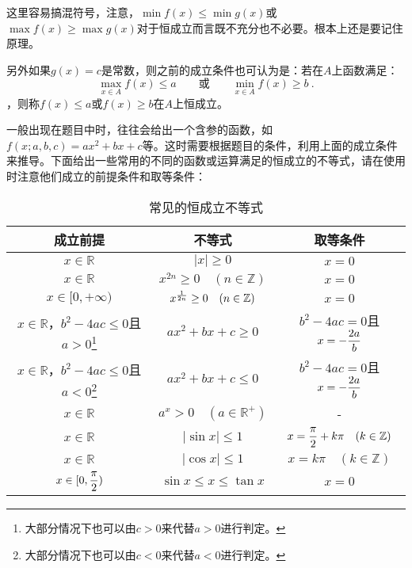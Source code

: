 这里容易搞混符号，注意，$\min f(x)\leq\min g(x)$或$\max f(x)\geq\max g(x)$对于恒成立而言既不充分也不必要。根本上还是要记住原理。

另外如果$g(x)=c$是常数，则之前的成立条件也可认为是：若在$A$上函数满足：
\begin{equation}
\displaystyle\max_{x\in A} f(x)\leq a\qquad\text{或}\qquad\min_{x\in A} f(x)\geq b~.
\end{equation}
，则称$f(x)\leq a$或$f(x)\geq b$在$A$上恒成立。

一般出现在题目中时，往往会给出一个含参的函数，如$f(x;a,b,c)=ax^2+bx+c$等。这时需要根据题目的条件，利用上面的成立条件来推导。下面给出一些常用的不同的函数或运算满足的恒成立的不等式，请在使用时注意他们成立的前提条件和取等条件：
\begin{table}[ht]
\centering
\caption{常见的恒成立不等式}\label{tab_HsIden1}
\begin{tabular}{|c|c|c|}
\hline
成立前提 & 不等式 & 取等条件 \\
\hline
$x\in\mathbb{R}$&$|x|\geq0$&$x=0$ \\
\hline
$x\in\mathbb{R}$&$x^{2n}\geq0\quad(n\in\mathbb{Z})$&$x=0$\\
\hline
$x\in[0,+\infty)$&$x^{1\over2n}\geq0\quad(n\in\mathbb{Z})$&$x=0$\\
\hline
$x\in\mathbb{R}$，$b^2-4ac\leq0$且$a>0$\footnote{大部分情况下也可以由$c>0$来代替$a>0$进行判定。}&$ax^2+bx+c\geq0$&$b^2-4ac=0$且$\displaystyle x=-{2a\over b}$\\
\hline
$x\in\mathbb{R}$，$b^2-4ac\leq0$且$a<0$\footnote{大部分情况下也可以由$c<0$来代替$a<0$进行判定。}&$ax^2+bx+c\leq0$&$b^2-4ac=0$且$\displaystyle x=-{2a\over b}$\\
\hline
$x\in\mathbb{R}$&$a^x>0\quad(a\in\mathbb{R}^+)$&-\\
\hline
$x\in\mathbb{R}$&$|\sin x|\leq 1$&$\displaystyle x={\pi\over2}+k\pi\quad (k\in\mathbb{Z})$\\
\hline
$x\in\mathbb{R}$&$|\cos x|\leq 1$&$x=k\pi\quad (k\in\mathbb{Z})$\\
\hline
$\displaystyle x\in[0,{\pi\over2})$&$\sin x\leq x\leq\tan x$&$x=0$\\
\hline
\end{tabular}
\end{table}


